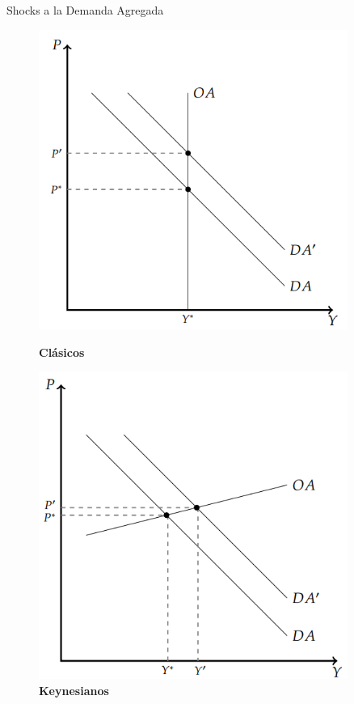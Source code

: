 \documentclass{beamer}
\begin{document}
\begin{frame}{Shocks a la Demanda Agregada}
    
    \begin{figure} [H]
        \centering
        \begin{minipage}{.5\textwidth}
        \centering
        \includegraphics[width=0.9\textwidth]{../Figures/C33.6.png}
        \caption{\textbf{Clásicos}}
        \end{minipage}%
        \begin{minipage}{.5\textwidth}
        \centering
        \includegraphics[width=0.9\textwidth]{../Figures/C33.7.png}
        \caption{\textbf{Keynesianos}}
        \end{minipage}
    \end{figure}
    
\end{frame}
\end{document}
